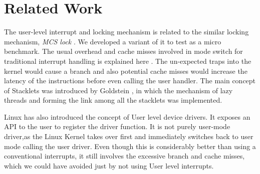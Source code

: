 \section{Related Work}

The user-level interrupt and locking mechanism is related to the similar
locking mechanism, \textit{MCS lock} \cite{mellor1991synchronization}. 
We developed a variant of it to test as a micro benchmark. The usual overhead
and cache misses involved in mode switch for traditional interrupt handling 
is explained here \cite{parker}. The un-expected traps into the kernel
would cause a branch and also potential cache misses would increase the latency
of the instructions before even calling the user handler. The main concept of
Stacklets was introduced by Goldstein \cite{goldstein}, in which the mechanism
of lazy threads and forming the link among all the stacklets was implemented.

Linux has also introduced the concept of User level device drivers. It exposes
an API to the user to register the driver function. It is not purely user-mode
driver,as the Linux Kernel takes over first and immediately switches back to 
user mode calling the user driver. Even though this is considerably better
than using a conventional interrupts, it still involves the excessive
branch and cache misses, which we could have avoided just by not using User
level interrupts.

